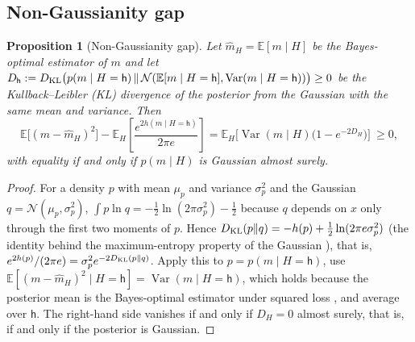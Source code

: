 \documentclass[preprint,12pt]{elsarticle}
\newtheorem{proposition}{Proposition}
\theoremstyle{definition}
\newcommand{\E}{\mathbb{E}}
\DeclareMathOperator{\Var}{Var}
\begin{document}
\subsection{Non-Gaussianity gap}
\begin{proposition}[Non-Gaussianity gap]
\label{prop:gap}
Let $\hat m_H=\E[m\mid H]$ be the Bayes-optimal estimator of $m$ and let $D_{\mathsf h}:=D_{\rm KL}\big(p(m\mid H=\mathsf h)\,\|\,\mathcal N(\E[m\mid H=\mathsf h],\Var(m\mid H=\mathsf h))\big)\ge0$ be the Kullback--Leibler (KL) divergence of the posterior from the Gaussian with the same mean and variance. Then
\begin{equation}
\E\big[(m-\hat m_H)^2\big]-\E_H\!\left[\frac{e^{2h(m\mid H=\mathsf h)}}{2\pi e}\right]=\E_H\!\Big[\Var(m\mid H)\big(1-e^{-2D_H}\big)\Big]\ \ge0,
\end{equation}
with equality if and only if $p(m\mid H)$ is Gaussian almost surely.
\end{proposition}
\begin{proof}
For a density $p$ with mean $\mu_p$ and variance $\sigma_p^2$ and the Gaussian $q=\mathcal N(\mu_p,\sigma_p^2)$, $\int p\ln q=-\tfrac12\ln(2\pi\sigma_p^2)-\tfrac12$ because $q$ depends on $x$ only through the first two moments of $p$. Hence $D_{\rm KL}(p\|q)=-h(p)+\tfrac12\ln(2\pi e\sigma_p^2)$ (the identity behind the maximum-entropy property of the Gaussian \cite[Sect.~8.6]{cover2006}), that is, $e^{2h(p)}/(2\pi e)=\sigma_p^2e^{-2D_{\rm KL}(p\|q)}$. Apply this to $p=p(m\mid H=\mathsf h)$, use $\E[(m-\hat m_H)^2\mid H=\mathsf h]=\Var(m\mid H=\mathsf h)$, which holds because the posterior mean is the Bayes-optimal estimator under squared loss \cite[Sect.~1.5.5]{bishop2006}, and average over $\mathsf h$. The right-hand side vanishes if and only if $D_H=0$ almost surely, that is, if and only if the posterior is Gaussian.
\end{proof}
\end{document}
